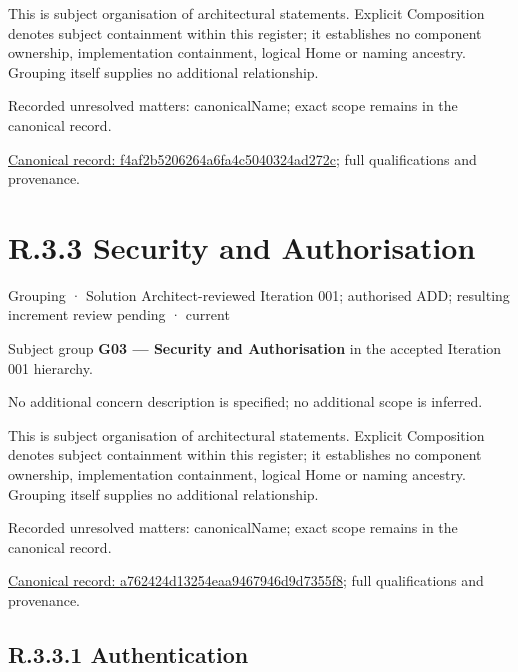 This is subject organisation of architectural statements. Explicit Composition denotes subject containment within this register; it establishes no component ownership, implementation containment, logical Home or naming ancestry. Grouping itself supplies no additional relationship.


{\small Recorded unresolved matters: canonicalName; exact scope remains in the canonical record.}\par
{\footnotesize \href{../../../../continuum/grouping/f4af2b5206264a6fa4c5040324ad272c.md}{Canonical record: f4af2b5206264a6fa4c5040324ad272c}; full qualifications and provenance.}\par
\section*{R.3.3 Security and Authorisation}
\label{navigation:R.3.3}

\label{element:a762424d13254eaa9467946d9d7355f8}
{\small Grouping · Solution Architect-reviewed Iteration 001; authorised ADD; resulting increment review pending · current}\par

Subject group \textbf{G03 — Security and Authorisation} in the accepted Iteration 001 hierarchy.



No additional concern description is specified; no additional scope is inferred.



This is subject organisation of architectural statements. Explicit Composition denotes subject containment within this register; it establishes no component ownership, implementation containment, logical Home or naming ancestry. Grouping itself supplies no additional relationship.


{\small Recorded unresolved matters: canonicalName; exact scope remains in the canonical record.}\par
{\footnotesize \href{../../../../continuum/grouping/a762424d13254eaa9467946d9d7355f8.md}{Canonical record: a762424d13254eaa9467946d9d7355f8}; full qualifications and provenance.}\par
\subsection*{R.3.3.1 Authentication}
\label{navigation:R.3.3.1}

